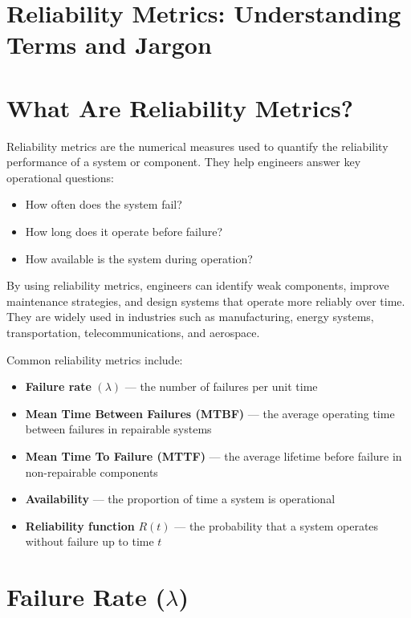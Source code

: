 \documentclass[12pt,a4paper]{article}
\begin{document}
\section*{Reliability Metrics: Understanding Terms and Jargon}

\section{What Are Reliability Metrics?}

Reliability metrics are the numerical measures used to quantify the reliability performance of a system or component. They help engineers answer key operational questions:
\begin{itemize}
    \item How often does the system fail?
    \item How long does it operate before failure?
    \item How available is the system during operation?
\end{itemize}

By using reliability metrics, engineers can identify weak components, improve maintenance strategies, and design systems that operate more reliably over time. They are widely used in industries such as manufacturing, energy systems, transportation, telecommunications, and aerospace.

Common reliability metrics include:
\begin{itemize}
    \item \textbf{Failure rate} $(\lambda)$ --- the number of failures per unit time
    \item \textbf{Mean Time Between Failures (MTBF)} --- the average operating time between failures in repairable systems
    \item \textbf{Mean Time To Failure (MTTF)} --- the average lifetime before failure in non-repairable components
    \item \textbf{Availability} --- the proportion of time a system is operational
    \item \textbf{Reliability function} $R(t)$ --- the probability that a system operates without failure up to time $t$
\end{itemize}

\section{Failure Rate ($\lambda$)}
\end{document}
